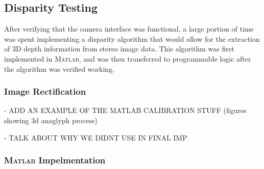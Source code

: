 \subsection{Disparity Testing}
After verifying that the camera interface was functional, a large portion of time was spent implementing a disparity algorithm that would allow for the extraction of 3D depth information from stereo image data. This algorithm was first implemented in \textsc{Matlab}, and was then transferred to programmable logic after the algorithm was verified working. 
\subsubsection{Image Rectification}
- ADD AN EXAMPLE OF THE MATLAB CALIBRATION STUFF (figures showing 3d anaglyph process)\par
- TALK ABOUT WHY WE DIDNT USE IN FINAL IMP


\subsubsection{\textsc{Matlab} Impelmentation}


